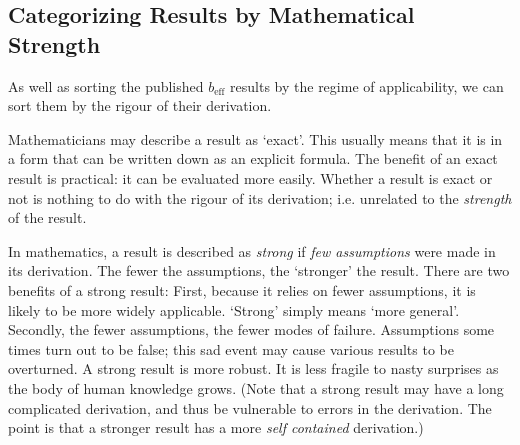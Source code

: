 \documentclass[a4paper]{report}
\newcommand{\beff}{\ensuremath{b_{\mathrm{eff}}}}
\begin{document}
\begin{table}
\begin{center}
\end{center}

\end{table}

\newpage


\subsection*{Categorizing Results by Mathematical Strength}

As well as sorting the published $\beff$ results by the regime of applicability, we can sort them by the rigour of their derivation.

Mathematicians may describe a result as `exact'.  This usually means that it is in a form that can be written down as an explicit formula.  The benefit of an exact result is practical: it can be evaluated more easily.  Whether a result is exact or not is nothing to do with the rigour of its derivation; i.e. unrelated to the \emph{strength} of the result. 

In mathematics, a result is described as \emph{strong} if \emph{few assumptions} were made in its derivation.  The fewer the assumptions, the `stronger' the result.
There are two benefits of a strong result: First, because it relies on fewer assumptions, it is likely to be more widely applicable.  `Strong' simply means `more general'.  Secondly, the fewer assumptions, the fewer modes of failure.  Assumptions some times turn out to be false; this sad event may cause various results to be overturned.  A strong result is more robust.  It is less fragile to nasty surprises as the body of human knowledge grows.  (Note that a strong result may have a long complicated derivation, and thus be vulnerable to errors in the derivation.  The point is that a stronger result has a more \emph{self contained} derivation.)
\end{document}
